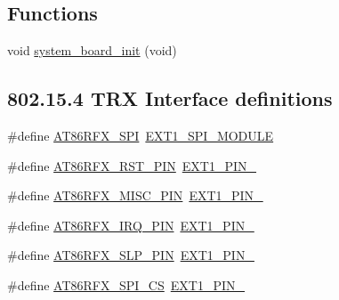 \subsection*{Functions}
\begin{DoxyCompactItemize}
\item 
void \mbox{\hyperlink{group__samd21__xplained__pro__group_gae25f520a05ec8f10b092636516e63c0e}{system\+\_\+board\+\_\+init}} (void)
\end{DoxyCompactItemize}
\subsection*{802.15.4 T\+RX Interface definitions}
\begin{DoxyCompactItemize}
\item 
\#define \mbox{\hyperlink{group__samd21__xplained__pro__group_gab3f9457f15a1d6c69e127b35f23b0ec8}{A\+T86\+R\+F\+X\+\_\+\+S\+PI}}~\mbox{\hyperlink{group__samd21__xplained__pro__features__group_gaa2643abcb5f9bf242d4854055a250370}{E\+X\+T1\+\_\+\+S\+P\+I\+\_\+\+M\+O\+D\+U\+LE}}
\item 
\#define \mbox{\hyperlink{group__samd21__xplained__pro__group_ga278eab8315ffbdd5aa700e17609a3320}{A\+T86\+R\+F\+X\+\_\+\+R\+S\+T\+\_\+\+P\+IN}}~\mbox{\hyperlink{group__samd21__xplained__pro__features__group_gaf90fe93609fea05220738c06abaabf71}{E\+X\+T1\+\_\+\+P\+I\+N\+\_}}
\item 
\#define \mbox{\hyperlink{group__samd21__xplained__pro__group_ga37c6c7515ae904b1b6e7f37c84fe03b9}{A\+T86\+R\+F\+X\+\_\+\+M\+I\+S\+C\+\_\+\+P\+IN}}~\mbox{\hyperlink{group__samd21__xplained__pro__features__group_ga7e54c69b2687572b6477c1618f0a9269}{E\+X\+T1\+\_\+\+P\+I\+N\+\_}}
\item 
\#define \mbox{\hyperlink{group__samd21__xplained__pro__group_ga19b49c52c6f415a14360f0c811849629}{A\+T86\+R\+F\+X\+\_\+\+I\+R\+Q\+\_\+\+P\+IN}}~\mbox{\hyperlink{group__samd21__xplained__pro__features__group_ga8c0f8b12c67dfecaac7bb4c45990fb57}{E\+X\+T1\+\_\+\+P\+I\+N\+\_}}
\item 
\#define \mbox{\hyperlink{group__samd21__xplained__pro__group_ga7173e3674298030d0dbc04edd71c52f5}{A\+T86\+R\+F\+X\+\_\+\+S\+L\+P\+\_\+\+P\+IN}}~\mbox{\hyperlink{group__samd21__xplained__pro__features__group_gad2c2d06f0f2761bcc4c4448a233061f9}{E\+X\+T1\+\_\+\+P\+I\+N\+\_}}
\item 
\#define \mbox{\hyperlink{group__samd21__xplained__pro__group_ga52d465934b1bffbcad261c6a093bc4c6}{A\+T86\+R\+F\+X\+\_\+\+S\+P\+I\+\_\+\+CS}}~\mbox{\hyperlink{group__samd21__xplained__pro__features__group_ga8cfe9248015c92ac426486d0d9a4db4c}{E\+X\+T1\+\_\+\+P\+I\+N\+\_}}

\end{DoxyCompactItemize}
